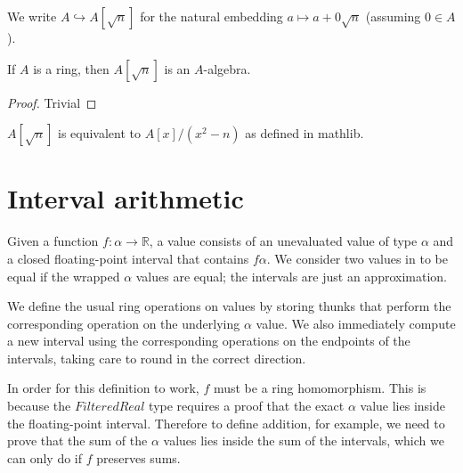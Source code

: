 
\begin{definition}
  \label{def:adjoinOfA}
  \leanok
  We write $A \hookrightarrow A[\sqrt{n}]$ for the natural embedding
  $a \mapsto a + 0\sqrt{n}$ (assuming $0 ∈ A$).
\end{definition}


\begin{lemma}
  \label{thm:adjoinAlgebra}
  \leanok
  If $A$ is a ring, then $A[\sqrt{n}]$ is an $A$-algebra.
\end{lemma}

\begin{proof}
  Trivial
  \leanok
\end{proof}

\begin{lemma}
  \label{thm:mathlibAdjoin}
  $A[\sqrt{n}]$ is equivalent to $A[x] / (x^2 - n)$ as defined in mathlib.
\end{lemma}

\section{Interval arithmetic}

\begin{definition}
  \label{def:filtered}
  \leanok
  Given a function $f : α → ℝ$, a  value consists of
  an unevaluated value of type $α$ and a closed floating-point interval that
  contains $f α$. We consider two values in  to be
  equal if the wrapped $α$ values are equal; the intervals are just an
  approximation.
\end{definition}

\begin{definition}
  \label{def:filteredRingOps}
  We define the usual ring operations on  values by storing
  thunks that perform the corresponding operation on the underlying $α$ value.
  We also immediately compute a new interval using the corresponding operations
  on the endpoints of the intervals, taking care to round in the correct
  direction.

  In order for this definition to work, $f$ must be a ring homomorphism. This is
  because the $FilteredReal$ type requires a proof that the exact $α$ value lies
  inside the floating-point interval. Therefore to define addition, for example,
  we need to prove that the sum of the $α$ values lies inside the sum of the
  intervals, which we can only do if $f$ preserves sums.
\end{definition}

